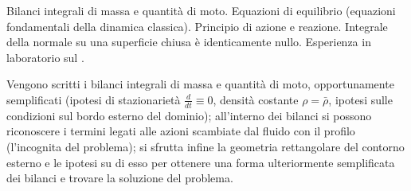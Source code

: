 \documentclass[letterpaper,10pt,italian]{jupyterBook}
\begin{document}
\sphinxAtStartPar
Bilanci integrali di massa e quantità di moto. Equazioni di equilibrio
(equazioni fondamentali della dinamica classica). Principio di azione e
reazione. Integrale della normale su una superficie chiusa è
identicamente nullo. Esperienza in laboratorio sul .

\sphinxAtStartPar
Vengono scritti i bilanci integrali di massa e quantità di moto,
opportunamente semplificati (ipotesi di stazionarietà
\(\frac{d}{dt} \equiv 0\), densità costante \(\rho = \bar{\rho}\), ipotesi
sulle condizioni sul bordo esterno del dominio); all’interno dei bilanci
si possono riconoscere i termini legati alle azioni scambiate dal fluido
con il profilo (l’incognita del problema); si sfrutta infine la
geometria rettangolare del contorno esterno e le ipotesi su di esso per
ottenere una forma ulteriormente semplificata dei bilanci e trovare la
soluzione del problema.
\end{document}
